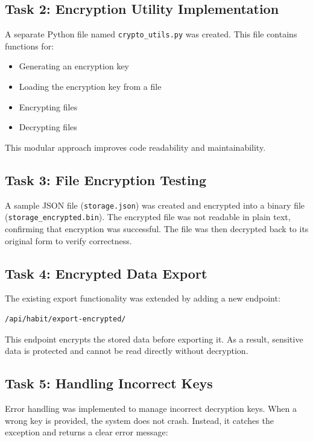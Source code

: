 \documentclass[12pt]{article}
\begin{document}
\subsection{Task 2: Encryption Utility Implementation}

A separate Python file named \texttt{crypto\_utils.py} was created. This file contains functions for:

\begin{itemize}
\item Generating an encryption key
\item Loading the encryption key from a file
\item Encrypting files
\item Decrypting files
\end{itemize}

This modular approach improves code readability and maintainability.

\subsection{Task 3: File Encryption Testing}

A sample JSON file (\texttt{storage.json}) was created and encrypted into a binary file (\texttt{storage\_encrypted.bin}). The encrypted file was not readable in plain text, confirming that encryption was successful. The file was then decrypted back to its original form to verify correctness.

\subsection{Task 4: Encrypted Data Export}

The existing export functionality was extended by adding a new endpoint:

\begin{verbatim}
/api/habit/export-encrypted/
\end{verbatim}

This endpoint encrypts the stored data before exporting it. As a result, sensitive data is protected and cannot be read directly without decryption.

\subsection{Task 5: Handling Incorrect Keys}

Error handling was implemented to manage incorrect decryption keys. When a wrong key is provided, the system does not crash. Instead, it catches the exception and returns a clear error message:
\end{document}
